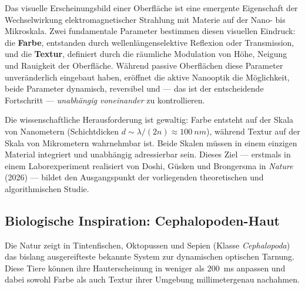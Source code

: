 ﻿\documentclass[a4paper,12pt]{article}
\theoremstyle{definition}
\begin{document}
	Das visuelle Erscheinungsbild einer Oberfläche ist eine emergente Eigenschaft
	der Wechselwirkung elektromagnetischer Strahlung mit Materie auf der Nano- bis
	Mikroskala. Zwei fundamentale Parameter bestimmen diesen visuellen Eindruck:
	die \textbf{Farbe}, entstanden durch wellenlängenselektive Reflexion oder
	Transmission, und die \textbf{Textur}, definiert durch die räumliche Modulation
	von Höhe, Neigung und Rauigkeit der Oberfläche. Während passive Oberflächen
	diese Parameter unveränderlich eingebaut haben, eröffnet die aktive Nanooptik
	die Möglichkeit, beide Parameter dynamisch, reversibel und --- das ist der
	entscheidende Fortschritt --- \emph{unabhängig voneinander} zu kontrollieren.
	
	Die wissenschaftliche Herausforderung ist gewaltig: Farbe entsteht auf der
	Skala von Nanometern (Schichtdicken $d \sim \lambda/(2n) \approx \SI{100}{nm}$),
	während Textur auf der Skala von Mikrometern wahrnehmbar ist. Beide Skalen
	müssen in einem einzigen Material integriert und unabhängig adressierbar sein.
	Dieses Ziel --- erstmals in einem Laborexperiment realisiert von Doshi,
	Güsken und Brongersma in \emph{Nature} (2026) --- bildet den Ausgangspunkt
	der vorliegenden theoretischen und algorithmischen Studie.
	
	\subsection{Biologische Inspiration: Cephalopoden-Haut}
	\label{ssec:bio}
	
	Die Natur zeigt in Tintenfischen, Oktopussen und Sepien (Klasse
	\textit{Cephalopoda}) das bislang ausgereifteste bekannte System zur dynamischen
	optischen Tarnung. Diese Tiere können ihre Hauterscheinung in weniger als
	\SI{200}{ms} anpassen und dabei sowohl Farbe als auch Textur ihrer Umgebung
	millimetergenau nachahmen.
	
\end{document}
